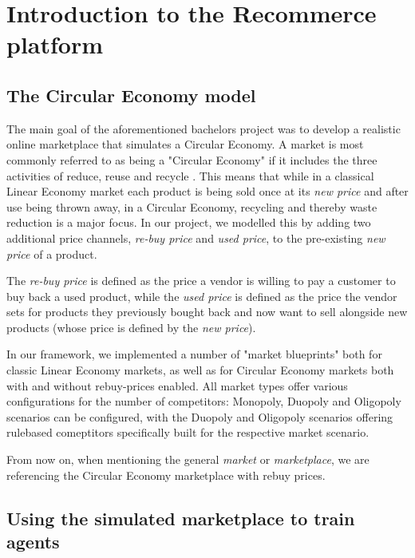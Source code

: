 \section{Introduction to the Recommerce platform}

\subsection{The Circular Economy model}\label{subsection:CircularEconomy}
The main goal of the aforementioned bachelors project was to develop a realistic online marketplace that simulates a Circular Economy. A market is most commonly referred to as being a "Circular Economy" if it includes the three activities of reduce, reuse and recycle \cite{circularEconomyDefinition}. This means that while in a classical Linear Economy market each product is being sold once at its \emph{new price} and after use being thrown away, in a Circular Economy, recycling and thereby waste reduction is a major focus. In our project, we modelled this by adding two additional price channels, \emph{re-buy price} and \emph{used price}, to the pre-existing \emph{new price} of a product.

The \emph{re-buy price} is defined as the price a vendor is willing to pay a customer to buy back a used product, while the \emph{used price} is defined as the price the vendor sets for products they previously bought back and now want to sell alongside new products (whose price is defined by the \emph{new price}).

In our framework, we implemented a number of "market blueprints" both for classic Linear Economy markets, as well as for Circular Economy markets both with and without rebuy-prices enabled. All market types offer various configurations for the number of competitors: Monopoly, Duopoly and Oligopoly scenarios can be configured, with the Duopoly and Oligopoly scenarios offering rulebased comeptitors specifically built for the respective market scenario. 

From now on, when mentioning the general \emph{market} or \emph{marketplace}, we are referencing the Circular Economy marketplace with rebuy prices.

\subsection{Using the simulated marketplace to train agents}\label{subsection:ReinforcementLearningIntroduction}


